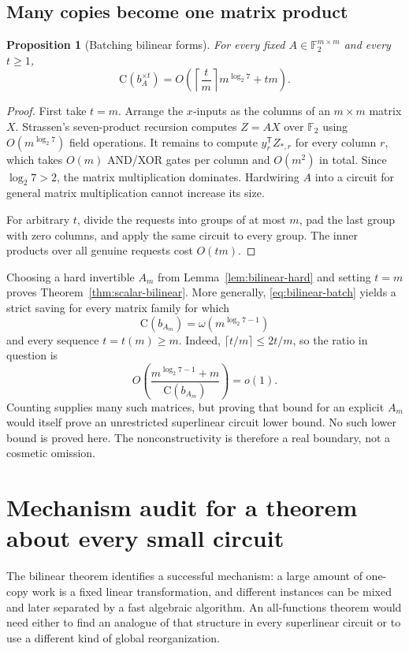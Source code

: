 \documentclass[11pt]{article}
\newtheorem{proposition}[theorem]{Proposition}
\theoremstyle{definition}
\newcommand{\F}{\mathbb F}
\newcommand{\C}{\mathrm{C}}
\begin{document}
\subsection{Many copies become one matrix product}

\begin{proposition}[Batching bilinear forms]
\label{prop:bilinear-batch}
For every fixed $A\in\F_2^{m\times m}$ and every $t\ge1$,
\[
 \C(b_A^{\times t})
   =O\!\left(\left\lceil\frac tm\right\rceil
       m^{\log_2 7}+tm\right).
 \label{eq:bilinear-batch}
\]
\end{proposition}

\begin{proof}
First take $t=m$.  Arrange the $x$-inputs as the columns of an $m\times m$
matrix $X$.  Strassen's seven-product recursion \cite{Strassen1969} computes
$Z=AX$ over $\F_2$ using $O(m^{\log_2 7})$ field operations.  It remains to
compute $y_r^{\mathsf T}Z_{*,r}$ for every column $r$, which takes $O(m)$
AND/XOR gates per column and $O(m^2)$ in total.  Since $\log_2 7>2$, the
matrix multiplication dominates.  Hardwiring $A$ into a circuit for general
matrix multiplication cannot increase its size.

For arbitrary $t$, divide the requests into groups of at most $m$, pad the
last group with zero columns, and apply the same circuit to every group.  The
inner products over all genuine requests cost $O(tm)$.
\end{proof}

Choosing a hard invertible $A_m$ from Lemma~\ref{lem:bilinear-hard} and
setting $t=m$ proves Theorem~\ref{thm:scalar-bilinear}.  More generally,
\eqref{eq:bilinear-batch} yields a strict saving for every matrix family for
which
\[
  \C(b_{A_m})=\omega(m^{\log_2 7-1})
\]
and every sequence $t=t(m)\ge m$.  Indeed,
$\lceil t/m\rceil\le2t/m$, so the ratio in question is
\[
 O\!\left(
  \frac{m^{\log_2 7-1}+m}{\C(b_{A_m})}
 \right)=o(1).
\]
Counting supplies many such matrices, but proving that bound for an explicit
$A_m$ would itself prove an unrestricted superlinear circuit lower bound.  No
such lower bound is proved here.  The nonconstructivity is therefore a real
boundary, not a cosmetic omission.

\section{Mechanism audit for a theorem about every small circuit}
\label{sec:mechanisms}

The bilinear theorem identifies a successful mechanism: a large amount of
one-copy work is a fixed linear transformation, and different instances can
be mixed and later separated by a fast algebraic algorithm.  An all-functions
theorem would need either to find an analogue of that structure in every
superlinear circuit or to use a different kind of global reorganization.
\end{document}
